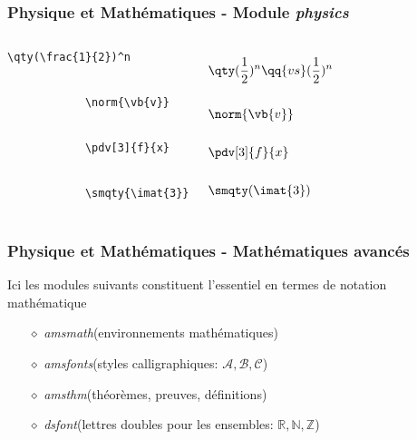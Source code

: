 \begin{frame}[fragile]
    \frametitle{Physique et Mathématiques - Module \textit{physics}}
    \begin{columns}
        \begin{lstlisting}[xleftmargin=-2cm]
            \qty(\frac{1}{2})^n


            \norm{\vb{v}}


            \pdv[3]{f}{x}


            \smqty{\imat{3}}
        \end{lstlisting}
        \vspace{-0.3cm}
        \begin{align*}
            &\qty(\frac{1}{2})^n\qq{vs}(\frac{1}{2})^n \\\\
            &\norm{\vb{v}} \\\\
            &\pdv[3]{f}{x} \\\\
            &\smqty(\imat{3})
        \end{align*}
    \end{columns}
\end{frame}

\begin{frame}
  \frametitle{Physique et Mathématiques - Mathématiques avancés}
  Ici les modules suivants constituent l'essentiel en termes de notation mathématique
  \vspace{0.3cm}
  \pause
    \begin{itemize}
        \item[$\diamond$] \textcolor{vibrant_green}{\textit{amsmath}}\footnotemark (environnements mathématiques)
        \item[$\diamond$] \textcolor{vibrant_green}{\textit{amsfonts}}\footnotemark (styles calligraphiques: $\mathcal{A}, \mathcal{B}, \mathcal{C}$)
        \item[$\diamond$] \textcolor{vibrant_green}{\textit{amsthm}}\footnotemark(théorèmes, preuves, définitions)
        \item[$\diamond$] \textcolor{vibrant_green}{\textit{dsfont}}\footnotemark (lettres doubles pour les ensembles: $\mathds{R}, \mathds{N}, \mathds{Z}$)
    \end{itemize}
\end{frame}

